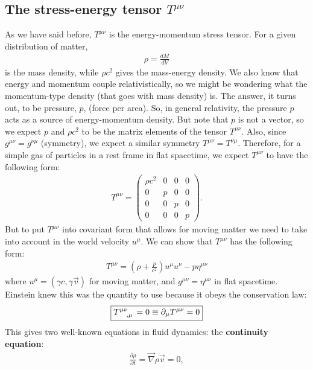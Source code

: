 \documentclass{article}
\theoremstyle{definition}
\begin{document}
\subsection{The stress-energy tensor $T^{\mu\nu}$}
As we have said before, $T^{\mu\nu}$ is the energy-momentum stress tensor. For a given distribution of matter,
\begin{align*}
\rho = \frac{dM}{dV}
\end{align*}
is the mass density, while $\rho c^2$ gives the mass-energy density. We also know that energy and momentum couple relativistically, so we might be wondering what the momentum-type density (that goes with mass density) is. The answer, it turns out, to be pressure, $p$, (force per area). So, in general relativity, the pressure $p$ acts as a source of energy-momentum density. But note that $p$ is not a vector, so we expect $p$ and $\rho c^2$ to be the matrix elements of the tensor $T^{\mu\nu}$. Also, since $g^{\mu\nu} = g^{\nu\mu}$ (symmetry), we expect a similar symmetry $T^{\mu\nu} = T^{\nu\mu}$. Therefore, for a simple gas of particles in a rest frame in flat spacetime, we expect $T^{\mu\nu}$ to have the following form:
\begin{align*}
T^{\mu\nu} = \begin{pmatrix}
\rho c^2 & 0 & 0 & 0\\
0 & p & 0 & 0\\
0 & 0 & p & 0\\
0 & 0 & 0 & p
\end{pmatrix}.
\end{align*}
But to put $T^{\mu\nu}$ into covariant form that allows for moving matter we need to take into account in the world velocity $u^{\mu}$. We can show that $T^{\mu\nu}$ has the following form:
\begin{align*}
\boxed{T^{\mu\nu} = \left( \rho + \frac{p}{c^2}\right)u^\mu u^\nu - p\eta^{\mu\nu}}
\end{align*}
where $u^\mu = (\gamma c, \gamma\vec{v})$ for moving matter, and $g^{\mu\nu} = \eta^{\mu\nu}$ in flat spacetime. Einstein knew this was the quantity to use because it obeys the conservation law:
\begin{align*}
\boxed{\tensor{T}{^{\mu\nu}_{,\mu}} = 0 \equiv \partial_\mu T^{\mu\nu} = 0}
\end{align*}
This gives two well-known equations in fluid dynamics: the \textbf{continuity equation}:
\begin{align*}
\frac{\partial \rho}{\partial t } = \vec{\nabla}\rho\vec{v} = 0,
\end{align*}
\end{document}
